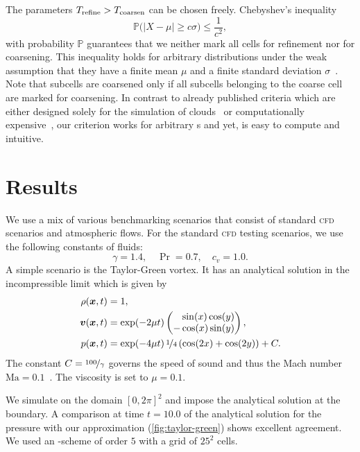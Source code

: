 \documentclass[runningheads]{llncs}
\begin{document}
The parameters $T_\text{refine} > T_\text{coarsen}$ can be chosen freely.
Chebyshev's inequality
\begin{equation}
  \label{eq:chebychev}
  \mathbb{P}\bigl(\vert X - \mu \vert \geq c \sigma \bigr) \leq \frac{1}{c^2},
\end{equation}
with probability $\mathbb{P}$ guarantees that we neither mark all cells for refinement nor for coarsening.
This inequality holds for arbitrary distributions under the weak assumption that they have a finite mean $\mu$ and a finite standard deviation $\sigma$~\cite{wasserman2004all}.
Note that subcells are coarsened only if all subcells belonging to the coarse cell are marked for coarsening.
In contrast to already published criteria which are either designed solely for the simulation of clouds~\cite{muller2010adaptive} or computationally expensive~\cite{fambri2017space}, our criterion works for arbitrary \pde{}s and yet, is easy to compute and intuitive.

\section{Results}
We use a mix of various benchmarking scenarios that consist of standard \textsc{cfd} scenarios and atmospheric flows.
%
For the standard \textsc{cfd} testing scenarios, we use the following constants of fluids:
\begin{equation}
  \gamma = 1.4, \quad \Pr = 0.7, \quad c_v = 1.0.
\end{equation}
A simple scenario is the Taylor-Green vortex.
It has an analytical solution in the incompressible limit which is given by
\begin{align}
  \label{eq:taylor-green}
  \begin{split}
  \rho(\bm{x}, t) &= 1,\\
  \bm{v}(\bm{x}, t) &= \exp(-2 \mu t)
  \begin{pmatrix}
    \phantom{-}\sin(x) \cos(y) \\
- \cos(x) \sin(y) 
    \end{pmatrix}, \\
  p(\bm{x}, t) &= \exp(-4 \mu t) \, \nicefrac{1}{4} \left( \cos(2x) + \cos(2y) \right) + C.
  \end{split}
\end{align}
The constant $C = \nicefrac{100}{\gamma}$ governs the speed of sound and thus the Mach number $\text{Ma} = 0.1$~\cite{dumbser2016high}. The viscosity is set to $\mu = 0.1$. 

We simulate on the domain $[0,2\pi]^2$ 
and impose the analytical solution at the boundary.
A comparison at time $t = 10.0$ of the analytical solution for the pressure with our approximation (\cref{fig:taylor-green}) shows excellent agreement.
We used an \aderdg{}-scheme of order $5$ with a grid of $25^2$ cells.
\end{document}
